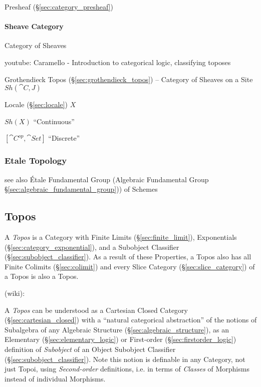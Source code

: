 Presheaf (\S\ref{sec:category_presheaf})



\paragraph{Sheave Category}\label{sec:sheave_category}\hfill

Category of Sheaves

youtube: Caramello - Introduction to categorical logic, classifying
toposes

Grothendieck Topos (\S\ref{sec:grothendieck_topos}) -- Category of
Sheaves on a Site $Sh(\cat{C},J)$

Locale (\S\ref{sec:locale}) $X$

$Sh(X)$ ``Continuous''

$[\cat{C}^{op},\cat{Set}]$ ``Discrete''





\subsubsection{Etale Topology}\label{sec:etale_topology}

see also \'Etale Fundamental Group (Algebraic Fundamental Group
\S\ref{sec:algebraic_fundamental_group})) of Schemes



\subsection{Topos}\label{sec:topos}

A \emph{Topos} is a Category with Finite Limits
(\S\ref{sec:finite_limit}), Exponentials
(\S\ref{sec:category_exponential}), and a Subobject Classifier
(\S\ref{sec:subobject_classifier}). As a result of these Properties, a
Topos also has all Finite Colimits (\S\ref{sec:colimit}) and every
Slice Category (\S\ref{sec:slice_category}) of a Topos is also a
Topos.

(wiki):

A \emph{Topos} can be understood as a Cartesian Closed Category
(\S\ref{sec:cartesian_closed}) with a ``natural categorical abstraction'' of
the notions of Subalgebra of any Algebraic Structure
(\S\ref{sec:algebraic_structure}), as an Elementary
(\S\ref{sec:elementary_logic}) or First-order (\S\ref{sec:firstorder_logic})
definition of \emph{Subobject} of an Object \fist Subobject Classifier
(\S\ref{sec:subobject_classifier}).
Note this notion is definable in any Category, not just Topoi, using
\emph{Second-order} definitions, i.e. in terms of \emph{Classes} of Morphisms
instead of individual Morphisms.


